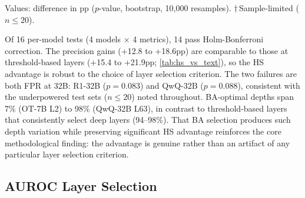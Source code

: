 \begin{table}[htbp]
\centering
\small
\caption{HS vs.\ text at BA-selected layers (60/20/20 split, same as main results). 14/16 per-model tests pass Holm-Bonferroni ($\alpha{=}0.05$); two FPR failures from underpowered 32B sets. BA-L: layer selected by pure balanced accuracy. Depth varies from 7\% to 98\%.}
\label{tab:ba_layer_results}
\setlength{\tabcolsep}{3pt}
\begin{flushleft}
\scriptsize Values: difference in pp ($p$-value, bootstrap, 10{,}000 resamples). $\dagger$\,Sample-limited ($n \leq 20$).
\end{flushleft}
\end{table}

Of 16 per-model tests (4 models $\times$ 4 metrics), 14 pass Holm-Bonferroni correction. The precision gains (+12.8 to +18.6pp) are comparable to those at threshold-based layers (+15.4 to +21.9pp; \cref{tab:hs_vs_text}), so the HS advantage is robust to the choice of layer selection criterion. The two failures are both FPR at 32B: R1-32B ($p{=}0.083$) and QwQ-32B ($p{=}0.088$), consistent with the underpowered test sets ($n{\leq}20$) noted throughout. BA-optimal depths span 7\% (OT-7B L2) to 98\% (QwQ-32B L63), in contrast to threshold-based layers that consistently select deep layers (94--98\%). That BA selection produces such depth variation while preserving significant HS advantage reinforces the core methodological finding: the advantage is genuine rather than an artifact of any particular layer selection criterion.


\subsection{AUROC Layer Selection}
\label{app:auroc_layer}


